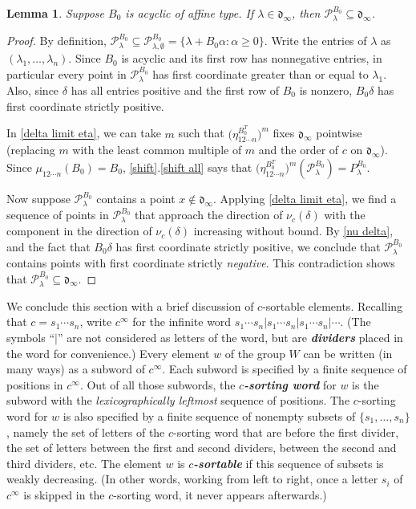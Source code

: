 \documentclass{amsart}
\newtheorem{lemma}[proposition]{Lemma}
\theoremstyle{definition}
\theoremstyle{remark}
\numberwithin{equation}{section}
\newcommand{\newword}[1]{\textbf{\emph{#1}}}
\newcommand{\set}[1]{{\lbrace #1 \rbrace}}
\newcommand{\0}{{\mathbf{0}}}
\renewcommand{\P}{\mathcal{P}}
\renewcommand{\d}{{\mathfrak d}}
\begin{document}
\begin{lemma}\label{P in dinf}
Suppose $B_0$ is acyclic of affine type.
If $\lambda\in\d_\infty$, then $\P^{B_0}_\lambda\subseteq\d_\infty$.
\end{lemma}
\begin{proof}
By definition, $\P^{B_0}_\lambda\subseteq\P^{B_0}_{\lambda,\emptyset}=\set{\lambda+B_0\alpha:\alpha\ge0}$.
Write the entries of $\lambda$ as $(\lambda_1,\ldots,\lambda_n)$.
Since $B_0$ is acyclic and its first row has nonnegative entries, in particular every point in $\P^{B_0}_\lambda$ has first coordinate greater than or equal to $\lambda_1$.
Also, since $\delta$ has all entries positive and the first row of $B_0$ is nonzero, $B_0\delta$ has first coordinate strictly positive.

In \cref{delta limit eta}, we can take $m$ such that $\bigl(\eta^{B_0^T}_{12\cdots n}\bigr)^m$ fixes $\d_\infty$ pointwise (replacing $m$ with the least common multiple of $m$ and the order of $c$ on $\d_\infty$).
Since $\mu_{12\cdots n}(B_0)=B_0$, \cref{shift}.\ref{shift all} says that $\bigl(\eta^{B_0^T}_{12\cdots n}\bigr)^m(\P_\lambda^{B_0})=P_\lambda^{B_0}$.

Now suppose $\P^{B_0}_\lambda$ contains a point $x\not\in\d_\infty$.
Applying \cref{delta limit eta}, we find a sequence of points in $\P^{B_0}_\lambda$ that approach the direction of $\nu_c(\delta)$ with the component in the direction of $\nu_c(\delta)$ increasing without bound.
By \cref{nu delta}, and the fact that $B_0\delta$ has first coordinate strictly positive, we conclude that $\P^{B_0}_\lambda$ contains points with first coordinate strictly \emph{negative}.
This contradiction shows that $\P^{B_0}_\lambda\subseteq\d_\infty$.
\end{proof}

We conclude this section with a brief discussion of $c$-sortable elements.  
Recalling that $c=s_1\cdots s_n$, write $c^\infty$ for the infinite word $s_1\cdots s_n|s_1\cdots s_n|s_1\cdots s_n|\cdots$.
(The symbols ``$|$'' are not considered as letters of the word, but are \newword{dividers} placed in the word for convenience.)
Every element $w$ of the group $W$ can be written (in many ways) as a subword of $c^\infty$.
Each subword is specified by a finite sequence of positions in $c^\infty$.
Out of all those subwords, the \newword{$c$-sorting word} for $w$ is the subword with the \emph{lexicographically leftmost} sequence of positions.
The $c$-sorting word for $w$ is also specified by a finite sequence of nonempty subsets of $\set{s_1,\ldots,s_n}$, namely the set of letters of the $c$-sorting word that are before the first divider, the set of letters between the first and second dividers, between the second and third dividers, etc.
The element $w$ is \newword{$c$-sortable} if this sequence of subsets is weakly decreasing.
(In other words, working from left to right, once a letter $s_i$ of $c^\infty$ is skipped in the $c$-sorting word, it never appears afterwards.)
\end{document}
